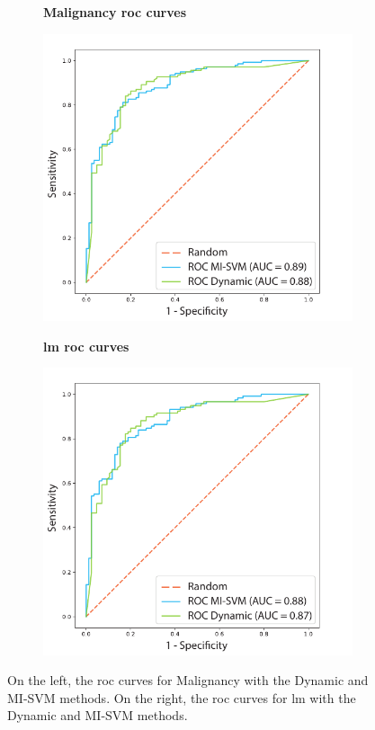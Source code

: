 \documentclass[journal,article,accept,moreauthors,pdftex, applsci]{Definitions/mdpi}
\begin{document}
\begin{figure}[H]
    \centering
    \begin{subfigure}{0.47\linewidth}
        \centering
        \textbf{Malignancy \ac{roc} curves}\par
        \includegraphics[width=\linewidth]{Figures/Result_Malignancy.pdf}
    \end{subfigure}
    \begin{subfigure}{0.47\linewidth}
        \centering
        \textbf{\ac{lm} \ac{roc} curves}\par
        \includegraphics[width=\linewidth]{Figures/Result_LMM.pdf}
    \end{subfigure} 
    \caption{On the left, the \ac{roc} curves for Malignancy with the Dynamic and MI-SVM methods. On the right, the \ac{roc} curves for \ac{lm} with the Dynamic and MI-SVM methods.}
    \label{fig:roc_results}
\end{figure}
\end{document}
